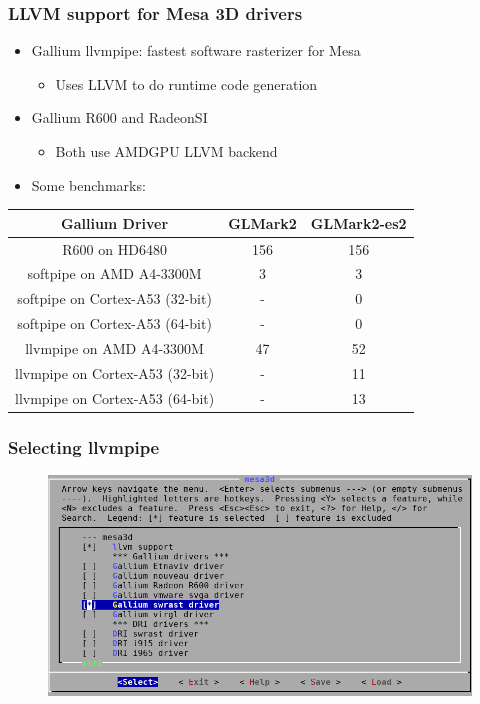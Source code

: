 \documentclass{beamer}
\begin{document}
\begin{frame}
\frametitle{LLVM support for Mesa 3D drivers}
\begin{itemize}
  \item Gallium llvmpipe: fastest software rasterizer for Mesa
  \begin{itemize}
    \item Uses LLVM to do runtime code generation
  \end{itemize}
  \item Gallium R600 and RadeonSI
  \begin{itemize}
    \item Both use AMDGPU LLVM backend
  \end{itemize}
    \item Some benchmarks:
\end{itemize}
\centering
  \begin{tabular}{c|c|c}
  \textbf{Gallium Driver} & \textbf{GLMark2} & \textbf{GLMark2-es2} \\
  \hline
  R600 on HD6480 & 156 & 156 \\
  softpipe on AMD A4-3300M & 3 & 3 \\
  softpipe on Cortex-A53 (32-bit) & - & 0 \\
  softpipe on Cortex-A53 (64-bit) & - & 0 \\
  llvmpipe on AMD A4-3300M & 47 & 52 \\
  llvmpipe on Cortex-A53 (32-bit) & - & 11 \\
  llvmpipe on Cortex-A53 (64-bit) & - & 13 \\
  \end{tabular}
\end{frame}

\begin{frame}
\frametitle{Selecting llvmpipe}
\begin{figure}
\includegraphics[width=1\linewidth]{img/mesa_swrast.png}
\end{figure}
\end{frame}
\end{document}
